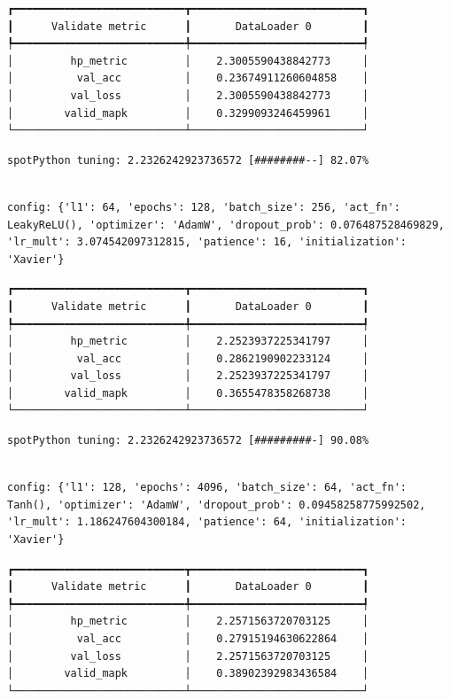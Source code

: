 \documentclass[
  letterpaper,
  DIV=11,
  numbers=noendperiod]{scrreprt}
\begin{document}
\begin{verbatim}
┏━━━━━━━━━━━━━━━━━━━━━━━━━━━┳━━━━━━━━━━━━━━━━━━━━━━━━━━━┓
┃      Validate metric      ┃       DataLoader 0        ┃
┡━━━━━━━━━━━━━━━━━━━━━━━━━━━╇━━━━━━━━━━━━━━━━━━━━━━━━━━━┩
│         hp_metric         │    2.3005590438842773     │
│          val_acc          │    0.23674911260604858    │
│         val_loss          │    2.3005590438842773     │
│        valid_mapk         │    0.3299093246459961     │
└───────────────────────────┴───────────────────────────┘
\end{verbatim}

\begin{verbatim}
spotPython tuning: 2.2326242923736572 [########--] 82.07% 
\end{verbatim}

\begin{verbatim}

config: {'l1': 64, 'epochs': 128, 'batch_size': 256, 'act_fn': LeakyReLU(), 'optimizer': 'AdamW', 'dropout_prob': 0.076487528469829, 'lr_mult': 3.074542097312815, 'patience': 16, 'initialization': 'Xavier'}
\end{verbatim}

\begin{verbatim}
┏━━━━━━━━━━━━━━━━━━━━━━━━━━━┳━━━━━━━━━━━━━━━━━━━━━━━━━━━┓
┃      Validate metric      ┃       DataLoader 0        ┃
┡━━━━━━━━━━━━━━━━━━━━━━━━━━━╇━━━━━━━━━━━━━━━━━━━━━━━━━━━┩
│         hp_metric         │    2.2523937225341797     │
│          val_acc          │    0.2862190902233124     │
│         val_loss          │    2.2523937225341797     │
│        valid_mapk         │    0.3655478358268738     │
└───────────────────────────┴───────────────────────────┘
\end{verbatim}

\begin{verbatim}
spotPython tuning: 2.2326242923736572 [#########-] 90.08% 
\end{verbatim}

\begin{verbatim}

config: {'l1': 128, 'epochs': 4096, 'batch_size': 64, 'act_fn': Tanh(), 'optimizer': 'AdamW', 'dropout_prob': 0.09458258775992502, 'lr_mult': 1.186247604300184, 'patience': 64, 'initialization': 'Xavier'}
\end{verbatim}

\begin{verbatim}
┏━━━━━━━━━━━━━━━━━━━━━━━━━━━┳━━━━━━━━━━━━━━━━━━━━━━━━━━━┓
┃      Validate metric      ┃       DataLoader 0        ┃
┡━━━━━━━━━━━━━━━━━━━━━━━━━━━╇━━━━━━━━━━━━━━━━━━━━━━━━━━━┩
│         hp_metric         │    2.2571563720703125     │
│          val_acc          │    0.27915194630622864    │
│         val_loss          │    2.2571563720703125     │
│        valid_mapk         │    0.38902392983436584    │
└───────────────────────────┴───────────────────────────┘
\end{verbatim}
\end{document}
